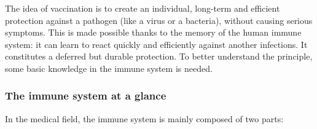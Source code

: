 \documentclass{article}
\begin{document}
            The idea of vaccination is to create an individual, long-term and efficient protection against a pathogen (like a virus or a bacteria), without causing serious symptoms.
            This is made possible thanks to the memory of the human immune system: it can learn to react quickly and efficiently against another infections.
            It constitutes a deferred but durable protection. To better understand the principle, some basic knowledge in the immune system is needed.

            \subsubsection*{The immune system at a glance}

                In the medical field, the immune system is mainly composed of two parts:
\end{document}
